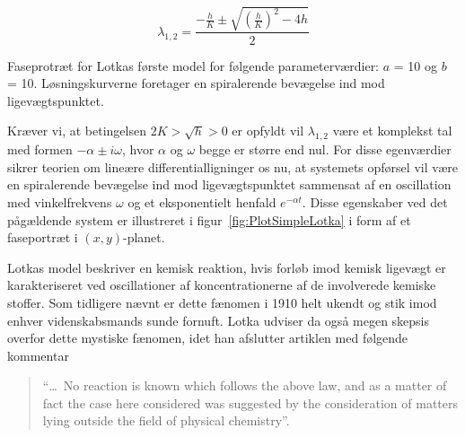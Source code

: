 \begin{equation}
  \lambda_{1,2} = 
  \frac{ -\frac{h}{K} \pm \sqrt{\left(\frac{h}{K}\right)^2-4h}}{2}
\end{equation}

{
\begin{center}
 \vspace{1cm}
 
 \vspace{1cm}
\end{center}
}
{
\caption{\protect\capsize Faseprotr{\ae}t for Lotkas
f{\o}rste model for f{\o}lgende parameterv{\ae}rdier: $a$ =
10 og $b$ = 10. L{\o}sningskurverne foretager en
spiralerende bev{\ae}gelse ind mod ligev{\ae}gtspunktet.
}
\label{fig:PlotSimpleLotka}
}

Kr{\ae}ver vi, at betingelsen $2K > \sqrt{h} > 0$ er
opfyldt vil $\lambda_{1,2}$ v{\ae}re et komplekst tal
med formen $-\alpha \pm i \omega$, hvor $\alpha$ og
$\omega$ begge er st{\o}rre end nul. For disse
egenv{\ae}rdier sikrer teorien om line{\ae}re
differentiallig\-ninger os nu, at systemets opf{\o}rsel vil
v{\ae}re en spiralerende bev{\ae}gelse ind mod
ligev{\ae}gts\-punktet sammensat af en oscillation med
vinkelfrekvens $\omega$ og et eksponentielt henfald
$e^{-\alpha t}$. Disse egen\-skaber ved det
p{\aa}g{\ae}ldende system er illustreret i
figur~\ref{fig:PlotSimpleLotka} i form af et
faseportr{\ae}t i $(x,y)$-planet.

\vspace{4.0mm}
Lotkas model beskriver en kemisk reaktion, hvis forl{\o}b
imod kemisk ligev{\ae}gt er karakteriseret ved
oscillationer af koncentrationerne af de involverede
kemi\-ske stoffer. Som tidligere n{\ae}vnt er dette
f{\ae}nomen i 1910 helt ukendt og stik imod enhver
videnskabsmands sunde fornuft. Lotka udviser da ogs{\aa}
megen skepsis overfor dette mystiske f{\ae}nomen, idet han
afslutter artiklen med f{\o}lgende kommentar

\begin{quote}
  ``\ldots\ No reaction is known which follows the above
  law, and as a matter of fact the case here considered was
  suggested by the consideration of matters lying outside
  the field of physical chemistry''. \cite{Lotka1}
\end{quote}

